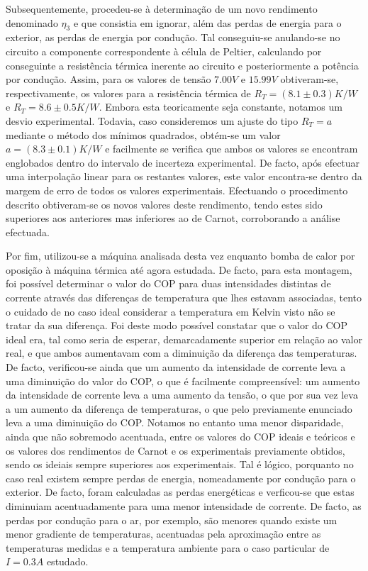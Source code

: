 \documentclass[9pt]{extarticle}
\begin{document}
\begin{multicols}{2}
\par Subsequentemente, procedeu-se à determinação de um novo rendimento denominado $\eta_3$ e que consistia em ignorar, além das perdas de energia para o exterior, as perdas de energia por condução. Tal conseguiu-se anulando-se no circuito a componente correspondente à célula de Peltier, calculando por conseguinte a resistência térmica inerente ao circuito e posteriormente a potência por condução. Assim, para os valores de tensão $7.00V$ e $15.99V$ obtiveram-se, respectivamente, os valores para a resistência térmica de $R_T=(8.1\pm0.3)K/W$ e $R_T=8.6\pm0.5K/W$. Embora esta teoricamente seja constante, notamos um desvio experimental. Todavia, caso consideremos um ajuste do tipo $R_T=a$ mediante o método dos mínimos quadrados, obtém-se um valor $a=(8.3\pm0.1)K/W$ e facilmente se verifica que ambos os valores se encontram englobados dentro do intervalo de incerteza experimental. De facto, após efectuar uma interpolação linear para os restantes valores, este valor encontra-se dentro da margem de erro de todos os valores experimentais. Efectuando o procedimento descrito obtiveram-se os novos valores deste rendimento, tendo estes sido superiores aos anteriores mas inferiores ao de Carnot, corroborando a análise efectuada.

\par Por fim, utilizou-se a máquina analisada desta vez enquanto bomba de calor por oposição à máquina térmica até agora estudada. De facto, para esta montagem, foi possível determinar o valor do COP para duas intensidades distintas de corrente através das diferenças de temperatura que lhes estavam associadas, tento o cuidado de no caso ideal considerar a temperatura em Kelvin visto não se tratar da sua diferença. Foi deste modo possível constatar que o valor do COP ideal era, tal como seria de esperar, demarcadamente superior em relação ao valor real, e que ambos aumentavam com a diminuição da diferença das temperaturas. De facto, verificou-se ainda que um aumento da intensidade de corrente leva a uma diminuição do valor do COP, o que é facilmente compreensível: um aumento da intensidade de corrente leva a uma aumento da tensão, o que por sua vez leva a um aumento da diferença de temperaturas, o que pelo previamente enunciado leva a uma diminuição do COP. Notamos no entanto uma menor disparidade, ainda que não sobremodo acentuada, entre os valores do COP ideais e teóricos e os valores dos rendimentos de Carnot e os experimentais previamente obtidos, sendo os ideiais sempre superiores aos experimentais. Tal é lógico, porquanto no caso real existem sempre perdas de energia, nomeadamente por condução para o exterior. De facto, foram calculadas as perdas energéticas e verficou-se que estas diminuiam acentuadamente para uma menor intensidade de corrente. De facto, as perdas por condução para o ar, por exemplo, são menores quando existe um menor gradiente de temperaturas, acentuadas pela aproximação entre as temperaturas medidas e a temperatura ambiente para o caso particular de $I=0.3A$ estudado.


\end{multicols}
\end{document}
